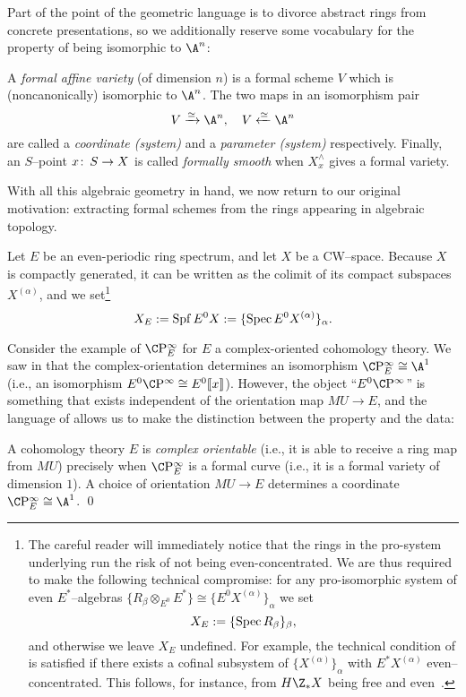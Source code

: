 Part of the point of the geometric language is to divorce abstract rings from concrete presentations, so we additionally reserve some vocabulary for the property of being isomorphic to $\A^n$:
\begin{definition}\label{DefnFormalVariety}
A \textit{formal affine variety} (of dimension $n$) is a formal scheme $V$ which is (noncanonically) isomorphic to $\A^n$.  The two maps in an isomorphism pair \[V \xrightarrow{\simeq} \A^n, \quad V \xleftarrow{\simeq} \A^n\] are called a \textit{coordinate (system)} and a \textit{parameter (system)} respectively.  Finally, an $S$--point $x\colon\thinspace S \to X$ is called \textit{formally smooth} when $X^\wedge_x$ gives a formal variety.
\end{definition}

With all this algebraic geometry in hand, we now return to our original motivation: extracting formal schemes from the rings appearing in algebraic topology.

\begin{definition}\label{FullDefnOfXE}
Let $E$ be an even-periodic ring spectrum, and let $X$ be a CW--space.  Because $X$ is compactly generated, it can be written as the colimit of its compact subspaces $X^{(\alpha)}$, and we set\footnote{The careful reader will immediately notice that the rings in the pro-system underlying  run the risk of not being even-concentrated.  We are thus required to make the following technical compromise: for any pro-isomorphic system of even $E^*$--algebras $\{R_\beta \otimes_{E^0} E^*\} \cong \{E^0 X^{(\alpha)}\}_\alpha$ we set \[X_E := \{\operatorname{Spec} R_\beta\}_\beta,\] and otherwise we leave $X_E$ undefined.  For example, the technical condition of  is satisfied if there exists a cofinal subsystem of $\{X^{(\alpha)}\}_\alpha$ with $E^* X^{(\alpha)}$ even--concentrated.  This follows, for instance, from $H\Z_* X$ being free and even~\cite[Definition 8.15, Proposition 8.17]{StricklandFSFG}.} \[X_E := \operatorname{Spf} E^0 X := \{\operatorname{Spec} E^0 X^{(\alpha)}\}_\alpha.\]
\end{definition}

Consider the example of $\CP^\infty_E$ for $E$ a complex-oriented cohomology theory.  We saw in  that the complex-orientation determines an isomorphism $\CP^\infty_E \cong \A^1$ (i.e., an isomorphism $E^0 \CP^\infty \cong E^0\ps{x}$).  However, the object ``$E^0 \CP^\infty$'' is something that exists independent of the orientation map $MU \to E$, and the language of  allows us to make the distinction between the property and the data:
\begin{lemma}
A cohomology theory $E$ is \textit{complex orientable} (i.e., it is able to receive a ring map from $MU$) precisely when $\CP^\infty_E$ is a formal curve (i.e., it is a formal variety of dimension $1$).  A choice of orientation $MU \to E$ determines a coordinate $\CP^\infty_E \cong \A^1$. \qed
\end{lemma}

